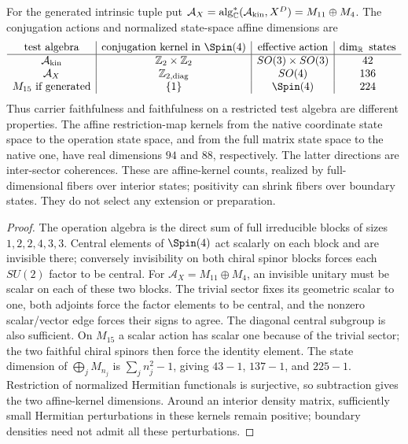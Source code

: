 \documentclass[12pt,a4paper]{article}
\begin{document}
\begin{theorem}
\label{p2c:thm:operational-symmetry-filtration}
For the generated intrinsic tuple put
$\mathcal A_X=\operatorname{alg}_{\mathbb C}^*(\mathcal A_{\rm kin},X^D)
=M_{11}\oplus M_4$.
The conjugation actions and normalized state-space affine dimensions are
\[
\begin{array}{c|c|c|c}
 \text{test algebra}&\text{conjugation kernel in }\Spin(4)
       &\text{effective action}&\dim_{\mathbb R}\text{ states}\\\hline
 \mathcal A_{\rm kin}&\mathbb Z_2\times\mathbb Z_2
       &SO(3)\times SO(3)&42\\
 \mathcal A_X&\mathbb Z_{2,\rm diag}&SO(4)&136\\
 M_{15}\ \text{if generated}&\{1\}&\Spin(4)&224
\end{array}
\]
Thus carrier faithfulness and faithfulness on a restricted test algebra
are different properties.  The affine restriction-map kernels from the
native coordinate state space to the operation state space, and from the
full matrix state space to the native one, have real dimensions $94$ and
$88$, respectively.  The latter directions are inter-sector coherences.
These are affine-kernel counts, realized by full-dimensional fibers over
interior states; positivity can shrink fibers over boundary states.
They do not select any extension or preparation.
\end{theorem}
\begin{proof}
The operation algebra is the direct sum of full irreducible blocks of
sizes $1,2,2,4,3,3$.  Central elements of $\Spin(4)$ act scalarly on
each block and are invisible there; conversely invisibility on both chiral
spinor blocks forces each $SU(2)$ factor to be central.  For
$\mathcal A_X=M_{11}\oplus M_4$, an invisible unitary must be scalar
on each of these two blocks.  The trivial sector fixes its geometric
scalar to one, both adjoints force the factor elements to be central,
and the nonzero scalar/vector edge forces their signs to agree.
The diagonal central subgroup is also sufficient.  On $M_{15}$ a scalar
action has scalar one because of the trivial sector; the two faithful
chiral spinors then force the identity element.  The state dimension of
$\bigoplus_jM_{n_j}$ is $\sum_j n_j^2-1$, giving
$43-1$, $137-1$, and $225-1$.  Restriction of normalized Hermitian
functionals is surjective, so subtraction gives the two affine-kernel
dimensions.  Around an interior density matrix, sufficiently small
Hermitian perturbations in these kernels remain positive; boundary
densities need not admit all these perturbations.
\end{proof}
\end{document}

